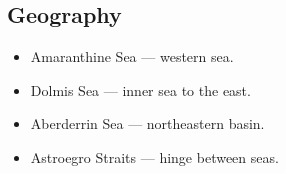 \subsection{Geography}
\begin{itemize}
\item Amaranthine Sea --- western sea.
\item Dolmis Sea --- inner sea to the east.
\item Aberderrin Sea --- northeastern basin.
\item Astroegro Straits --- hinge between seas.
\end{itemize}

